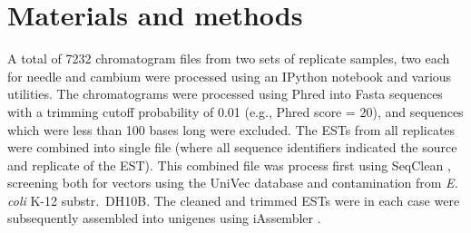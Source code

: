 \documentclass[11pt]{article}
\begin{document}







\section*{Materials and methods}\label{ss:mats}
A total of 7232 chromatogram files from two sets of replicate samples,
two each for needle and cambium were processed using an IPython
\citep[v 2.1]{per-gra:2007} notebook and various utilities.  The
chromatograms were processed using Phred \citep[v.\
020425]{ewing1998b} into Fasta sequences with a trimming cutoff
probability of 0.01 (e.g., Phred score = 20), and sequences which were
less than 100 bases long were excluded.  The ESTs from all replicates
were combined into single file (where all sequence identifiers
indicated the source and replicate of the EST).  This combined file
was process first using SeqClean \citep[v.\ 2/2011][default
parameters]{citeulike:1911083}, screening both for vectors using the
UniVec \citep{cochrane01012010} database and contamination from
\textit{E. coli} K-12 substr.\ DH10B.  The cleaned and trimmed ESTs
were in each case were subsequently assembled into unigenes using
iAssembler \citep[v.\ 1.3.2][default parameters]{zheng2011iassembler}.
\end{document}
